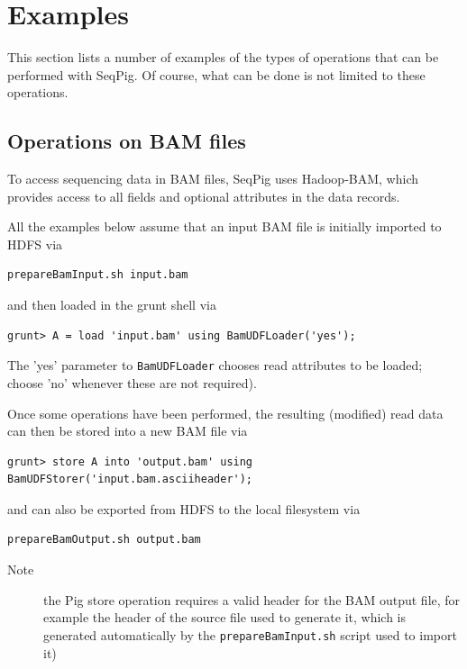 
\section{Examples}
\label{sect:examples}

This section lists a number of examples of the types of operations that can be
performed with SeqPig.  Of course, what can be done is not limited to these
operations.

\subsection{Operations on BAM files}

To access sequencing data in BAM files, SeqPig uses Hadoop-BAM, which provides
access to all fields and optional attributes in the data records.


All the examples below assume that an input BAM file is initially imported to HDFS via
\begin{lstlisting} 
prepareBamInput.sh input.bam
\end{lstlisting} 
and then loaded in the grunt shell via
\begin{lstlisting} 
grunt> A = load 'input.bam' using BamUDFLoader('yes');
\end{lstlisting} 
The 'yes' parameter to {\tt BamUDFLoader} chooses read attributes to be loaded; choose 'no' whenever these
are not required).

Once some operations have been performed, the resulting (modified) read
data can then be stored into a new BAM file via
\begin{lstlisting}
grunt> store A into 'output.bam' using BamUDFStorer('input.bam.asciiheader');
\end{lstlisting}
and can also be exported from HDFS to the local filesystem via
\begin{lstlisting}
prepareBamOutput.sh output.bam
\end{lstlisting}
\begin{description}
	\item[Note] the Pig store operation requires a valid header for the BAM output file,
for example the header of the source file used to generate it, which is
generated automatically by the {\tt prepareBamInput.sh} script used to import it)
\end{description}

